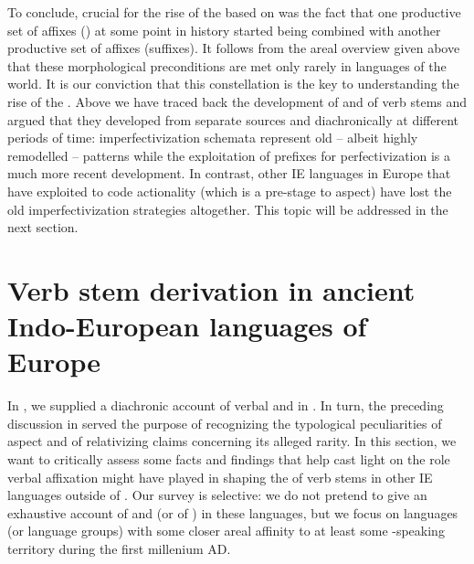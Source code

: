 \documentclass[output=paper]{langsci/langscibook}
\begin{document}
To conclude, crucial for the rise of the   based on  was the fact that one productive set of affixes () at some point in history started being combined with another productive set of affixes (suffixes). It follows from the areal overview given above that these morphological preconditions are met only rarely in languages of the world. It is our conviction that this constellation is the key to understanding the rise of the  . Above we have traced back the development of  and  of verb stems and argued that they developed from separate sources and diachronically at different periods of time: imperfectivization schemata represent old – albeit highly remodelled – patterns while the exploitation of prefixes for perfectivization is a much more recent development. In contrast, other IE languages in Europe that have exploited  to code actionality (which is a pre-stage to aspect) have lost the old imperfectivization strategies altogether. This topic will be addressed in the next section.

\section{Verb stem derivation in ancient Indo-European languages of Europe}\label{sec:wiemerserzant:5}

In , we supplied a diachronic account of verbal  and  in . In turn, the preceding discussion in  served the purpose of recognizing the typological peculiarities of  aspect and of relativizing claims concerning its alleged rarity. In this section, we want to critically assess some facts and findings that help cast light on the role verbal affixation might have played in shaping the  of verb stems in other IE languages outside of . Our survey is selective: we do not pretend to give an exhaustive account of  and  (or of ) in these languages, but we focus on languages (or language groups) with some closer areal affinity to at least some -speaking territory during the first millenium AD.
\end{document}
